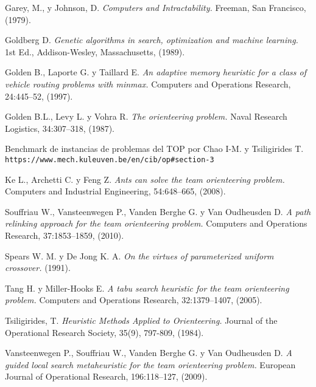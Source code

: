 \begin{thebibliography}{9}
Garey, M., y Johnson, D.
\textit{Computers and Intractability.}
Freeman, San Francisco, (1979).

Goldberg D.
\textit{Genetic algorithms in search, optimization and machine learning.}
1st Ed., Addison-Wesley, Massachusetts, (1989).

Golden B., Laporte G. y Taillard E.
\textit{An adaptive memory heuristic for a class of vehicle routing problems with minmax.}
Computers and Operations Research, 24:445–52, (1997).

Golden B.L., Levy L. y Vohra R. 
\textit{The orienteering problem.}
Naval Research Logistics, 34:307–318, (1987).

Benchmark de instancias de problemas del TOP por Chao I-M. y Tsiligirides T.
\\\texttt{https://www.mech.kuleuven.be/en/cib/op\#section-3}

Ke L., Archetti C. y Feng Z.
\textit{Ants can solve the team orienteering problem.}
Computers and Industrial Engineering, 54:648–665, (2008).

Souffriau W., Vansteenwegen P., Vanden Berghe G. y Van Oudheusden D.
\textit{A path relinking approach for the team orienteering problem.}
Computers and Operations Research, 37:1853–1859, (2010).

Spears W. M. y De Jong K. A. 
\textit{On the virtues of parameterized uniform crossover.}
(1991).

Tang H. y Miller-Hooks E.
\textit{A tabu search heuristic for the team orienteering problem.}
Computers and Operations Research, 32:1379–1407, (2005).

Tsiligirides, T.
\textit{Heuristic Methods Applied to Orienteering.}
Journal of the Operational Research Society, 35(9), 797-809, (1984).

Vansteenwegen P., Souffriau W., Vanden Berghe G. y Van Oudheusden D.
\textit{A guided local search metaheuristic for the team orienteering problem.}
European Journal of Operational Research, 196:118–127, (2009).


\end{thebibliography}